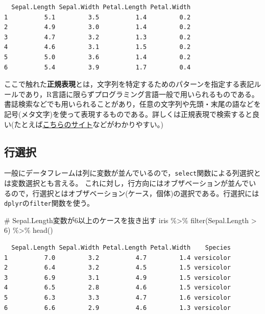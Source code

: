 \documentclass[
  a4paper,
]{ltjsbook}
\newenvironment{Shaded}{\begin{snugshade}}{\end{snugshade}}
\newcommand{\CommentTok}[1]{\textcolor[rgb]{0.37,0.37,0.37}{#1}}
\newcommand{\DecValTok}[1]{\textcolor[rgb]{0.68,0.00,0.00}{#1}}
\newcommand{\FunctionTok}[1]{\textcolor[rgb]{0.28,0.35,0.67}{#1}}
\newcommand{\NormalTok}[1]{\textcolor[rgb]{0.00,0.23,0.31}{#1}}
\newcommand{\SpecialCharTok}[1]{\textcolor[rgb]{0.37,0.37,0.37}{#1}}
\begin{document}
\begin{verbatim}
  Sepal.Length Sepal.Width Petal.Length Petal.Width
1          5.1         3.5          1.4         0.2
2          4.9         3.0          1.4         0.2
3          4.7         3.2          1.3         0.2
4          4.6         3.1          1.5         0.2
5          5.0         3.6          1.4         0.2
6          5.4         3.9          1.7         0.4
\end{verbatim}

ここで触れた\textbf{正規表現}とは，文字列を特定するためのパターンを指定する表記ルールであり，R言語に限らずプログラミング言語一般で用いられるものである。書誌検索などでも用いられることがあり，任意の文字列や先頭・末尾の語などを記号(メタ文字)を使って表現するものである。詳しくは正規表現で検索すると良い(たとえば\href{https://userweb.mnet.ne.jp/nakama/}{こちらのサイト}などがわかりやすい。)

\subsection{行選択}\label{ux884cux9078ux629e}

一般にデータフレームは列に変数が並んでいるので，\texttt{select}関数による列選択とは変数選択とも言える。
これに対し，行方向にはオブザベーションが並んでいるので，行選択とはオブザベーション(ケース，個体)の選択である。行選択には\texttt{dplyr}の\texttt{filter}関数を使う。

\begin{Shaded}
\begin{Highlighting}[]
\CommentTok{\# Sepal.Length変数が6以上のケースを抜き出す}
\NormalTok{iris }\SpecialCharTok{\%\textgreater{}\%}
  \FunctionTok{filter}\NormalTok{(Sepal.Length }\SpecialCharTok{\textgreater{}} \DecValTok{6}\NormalTok{) }\SpecialCharTok{\%\textgreater{}\%}
  \FunctionTok{head}\NormalTok{()}
\end{Highlighting}
\end{Shaded}

\begin{verbatim}
  Sepal.Length Sepal.Width Petal.Length Petal.Width    Species
1          7.0         3.2          4.7         1.4 versicolor
2          6.4         3.2          4.5         1.5 versicolor
3          6.9         3.1          4.9         1.5 versicolor
4          6.5         2.8          4.6         1.5 versicolor
5          6.3         3.3          4.7         1.6 versicolor
6          6.6         2.9          4.6         1.3 versicolor
\end{verbatim}
\end{document}
